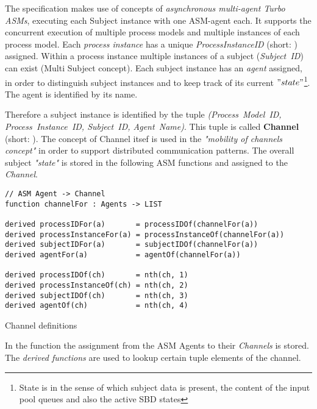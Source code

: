 The specification makes use of concepts of \textit{asynchronous multi-agent Turbo ASMs}, executing each Subject instance with one ASM-agent each. It supports the concurrent execution of multiple process models and multiple instances of each process model. 
Each \textit{process instance} has a unique \textit{ProcessInstanceID} (short: ) assigned. 
Within a process instance multiple instances of a subject (\textit{Subject~ID}) can exist (Multi Subject concept). Each subject instance has an \textit{agent} assigned, in order to distinguish subject instances and to keep track of its current $"state"$\footnote{State is in the sense of which subject data is present, the content of the input pool queues and also the active SBD states}. The agent is identified by its name.

Therefore a subject instance is identified by the tuple \textit{(Process~Model~ID, Process~Instance~ID, Subject~ID, Agent~Name)}. This tuple is called \textbf{Channel} (short: ). The concept of Channel itsef is used in the \textit{"mobility of channels concept"} in order to support distributed communication patterns. The overall subject \textit{"state"} is stored in the following ASM functions and assigned to the \textit{Channel}.

\begin{listing}[htbp]
\begin{verbatim}
// ASM Agent -> Channel
function channelFor : Agents -> LIST

derived processIDFor(a)       = processIDOf(channelFor(a))
derived processInstanceFor(a) = processInstanceOf(channelFor(a))
derived subjectIDFor(a)       = subjectIDOf(channelFor(a))
derived agentFor(a)           = agentOf(channelFor(a))

derived processIDOf(ch)       = nth(ch, 1)
derived processInstanceOf(ch) = nth(ch, 2)
derived subjectIDOf(ch)       = nth(ch, 3)
derived agentOf(ch)           = nth(ch, 4)
\end{verbatim}
\caption{Channel definitions}
\label{lst:shortasm:channelFor}
\end{listing}

In the function  the assignment from the ASM Agents to their \textit{Channels} is stored.
The \textit{derived functions} are used to lookup certain tuple elements of the channel.\\


